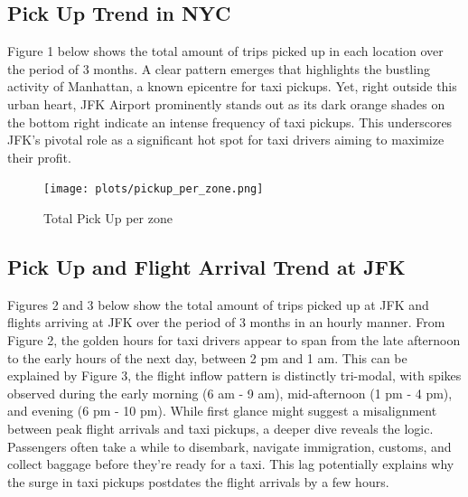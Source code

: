 \documentclass[11pt]{article}
\begin{document}
\subsection{Pick Up Trend in NYC}
Figure 1 below shows the total amount of trips picked up in each location over the period of 3 months. A clear pattern emerges that highlights the bustling activity of Manhattan, a known epicentre for taxi pickups. Yet, right outside this urban heart, JFK Airport prominently stands out as its dark orange shades on the bottom right indicate an intense frequency of taxi pickups. This underscores JFK's pivotal role as a significant hot spot for taxi drivers aiming to maximize their profit.

\begin{figure}[h]
    \texttt{[image: plots/pickup\_per\_zone.png]}
    \centering
    \caption{Total Pick Up per zone} 
\end{figure}

\subsection{Pick Up and Flight Arrival Trend at JFK}
Figures 2 and 3 below show the total amount of trips picked up at JFK and flights arriving at JFK over the period of 3 months in an hourly manner. From Figure 2, the golden hours for taxi drivers appear to span from the late afternoon to the early hours of the next day, between 2 pm and 1 am. This can be explained by Figure 3, the flight inflow pattern is distinctly tri-modal, with spikes observed during the early morning (6 am - 9 am), mid-afternoon (1 pm - 4 pm), and evening (6 pm - 10 pm). While first glance might suggest a misalignment between peak flight arrivals and taxi pickups, a deeper dive reveals the logic. Passengers often take a while to disembark, navigate immigration, customs, and collect baggage before they're ready for a taxi. This lag potentially explains why the surge in taxi pickups postdates the flight arrivals by a few hours. 
\end{document}
